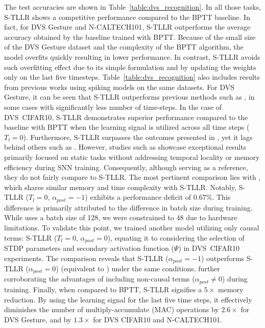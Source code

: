 \documentclass[10pt]{article} %
\begin{document}
        The test accuracies are shown in Table~\ref{table:dvs_recognition}. 
        In all those tasks, S-TLLR shows a competitive performance compared to the BPTT baseline.
        In fact, for DVS Gesture and N-CALTECH101, S-TLLR outperforms the average accuracy obtained by the baseline trained with BPTT.
        Because of the small size of the DVS Gesture dataset and the complexity of the BPTT algorithm, the model overfits quickly resulting in lower performance.
        In contrast, S-TLLR avoids such overfitting effect due to its simple formulation and by updating the weights only on the last five timesteps.  
        Table~\ref{table:dvs_recognition} also includes results from previous works using spiking models on the same datasets.
        For DVS Gesture, it can be seen that S-TLLR outperforms previous methods such as \cite{Xiao2022OnlineNetworks, Shrestha2018SLAYER:Time, Kaiser2020SynapticDECOLLE}, in some cases with significantly less number of time-steps.
        In the case of DVS~CIFAR10, S-TLLR demonstrates superior performance compared to the baseline with BPTT when the learning signal is utilized across all time steps ($T_l=0$). 
        Furthermore, S-TLLR surpasses the outcomes presented in \cite{Zheng2021GoingNetworks, Fang2021IncorporatingNetworks, Li2021DifferentiableNetworks}, yet it lags behind others such as \cite{Xiao2022OnlineNetworks, Deng2022TemporalRe-weighting, Meng2022TrainingRepresentation}. 
        However, studies such as \cite{Deng2022TemporalRe-weighting, Meng2022TrainingRepresentation} showcase exceptional results primarily focused on static tasks without addressing temporal locality or memory efficiency during SNN training. 
        Consequently, although serving as a reference, they do not fairly compare to S-TLLR.
        The most pertinent comparison lies with \cite{Xiao2022OnlineNetworks}, which shares similar memory and time complexity with S-TLLR. 
        Notably, S-TLLR ($T_l=0$, $\alpha_{post}=-1$) exhibits a performance deficit of $0.67\%$. 
        This difference is primarily attributed to the difference in batch size during training. 
        While \cite{Xiao2022OnlineNetworks} uses a batch size of 128, we were constrained to 48 due to hardware limitations.
        To validate this point, we trained another model utilizing only causal terms: S-TLLR ($T_l=0$, $\alpha_{post}=0$), equating it to \cite{Xiao2022OnlineNetworks} considering the selection of STDP parameters and secondary activation function ($\Psi$) in DVS~CIFAR10 experiments. 
        The comparison reveals that S-TLLR ($\alpha_{post}=-1$) outperforms S-TLLR ($\alpha_{post}=0$) (equivalent to \cite{Xiao2022OnlineNetworks}) under the same conditions, further corroborating the advantages of including non-causal terms ($\alpha_{post}\neq0$) during training.
        Finally, when compared to BPTT, S-TLLR signifies a $5\times$ memory reduction. 
        By using the learning signal for the last five time steps, it effectively diminishes the number of multiply-accumulate (MAC) operations by $2.6\times$ for DVS Gesture, and by $1.3\times$ for DVS CIFAR10 and N-CALTECH101. 
        
\end{document}

